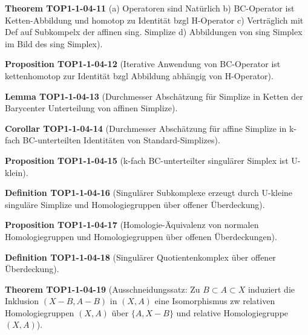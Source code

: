 \documentclass[10pt, letterpaper]{article}
\newcommand{\CustomHeading}[3]{%
  \par\medskip\noindent%
  \textbf{#1 #2} \textnormal{(#3)}.\enskip%
}
\newenvironment{DEF}[2]{\CustomHeading{Definition}{#1}{#2}}{}
\newenvironment{PROP}[2]{\CustomHeading{Proposition}{#1}{#2}}{}
\newenvironment{THEO}[2]{\CustomHeading{Theorem}{#1}{#2}}{}
\newenvironment{LEM}[2]{\CustomHeading{Lemma}{#1}{#2}}{}
\newenvironment{KORO}[2]{\CustomHeading{Corollar}{#1}{#2}}{}
\begin{document}
\begin{THEO}{TOP1-1-04-11}{a) Operatoren sind Natürlich 
b) BC-Operator ist Ketten-Abbildung und homotop zu Identität bzgl H-Operator 
c) Verträglich mit Def auf Subkompelx der affinen sing. Simplize
d) Abbildungen von sing Simplex im Bild des sing Simplex}
\end{THEO}

\begin{PROP}{TOP1-1-04-12}{Iterative Anwendung von BC-Operator ist kettenhomotop zur Identität bzgl Abbildung abhängig von H-Operator}
\end{PROP}

\begin{LEM}{TOP1-1-04-13}{Durchmesser Abschätzung für Simplize in Ketten der Barycenter Unterteilung von affinen Simplize}
\end{LEM}

\begin{KORO}{TOP1-1-04-14}{Durchmesser Abschätzung für affine Simplize in k-fach BC-unterteilten Identitäten von Standard-Simplizes}
\end{KORO}

\begin{PROP}{TOP1-1-04-15}{k-fach BC-unterteilter singulärer Simplex ist U-klein}
\end{PROP}

\begin{DEF}{TOP1-1-04-16}{Singulärer Subkomplexe erzeugt durch U-kleine singuläre Simplize und Homologiegruppen über offener Überdeckung}
\end{DEF}

\begin{PROP}{TOP1-1-04-17}{Homologie-Äquivalenz von normalen Homologiegruppen und Homologiegruppen über offenen Überdeckungen}
\end{PROP}

\begin{DEF}{TOP1-1-04-18}{Singulärer Quotientenkomplex über offener Überdeckung}
\end{DEF}

\begin{THEO}{TOP1-1-04-19}{Ausschneidungssatz: Zu $B\subset A\subset X$ induziert die Inklusion $(X-B,A-B)$ in $(X,A)$ eine Isomorphismus zw relativen Homologiegruppen $(X,A)$ über $\{A,X-B\}$ und relative Homologiegruppe $(X,A)$}
\end{THEO}
\end{document}
